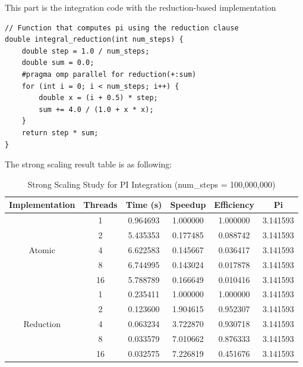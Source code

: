 \documentclass[11pt]{article}
\begin{document}
This part is the integration code with the reduction-based implementation
\begin{verbatim}
// Function that computes pi using the reduction clause
double integral_reduction(int num_steps) {
    double step = 1.0 / num_steps;
    double sum = 0.0;
    #pragma omp parallel for reduction(+:sum)
    for (int i = 0; i < num_steps; i++) {
        double x = (i + 0.5) * step;
        sum += 4.0 / (1.0 + x * x);
    }
    return step * sum;
}
\end{verbatim}

The strong scaling result table is as following:

\begin{table}[H]
\centering
\begin{tabular}{|c|c|c|c|c|c|}
\hline
\textbf{Implementation} & \textbf{Threads} & \textbf{Time (s)} & \textbf{Speedup} & \textbf{Efficiency} & \textbf{Pi} \\ \hline
\multirow{5}{*}{Atomic}
& 1 & 0.964693 & 1.000000 & 1.000000 & 3.141593 \\ \cline{2-6}
& 2 & 5.435353 & 0.177485 & 0.088742 & 3.141593 \\ \cline{2-6}
& 4 & 6.622583 & 0.145667 & 0.036417 & 3.141593 \\ \cline{2-6}
& 8 & 6.744995 & 0.143024 & 0.017878 & 3.141593 \\ \cline{2-6}
& 16 & 5.788789 & 0.166649 & 0.010416 & 3.141593 \\ \hline
\multirow{5}{*}{Reduction}
& 1 & 0.235411 & 1.000000 & 1.000000 & 3.141593 \\ \cline{2-6}
& 2 & 0.123600 & 1.904615 & 0.952307 & 3.141593 \\ \cline{2-6}
& 4 & 0.063234 & 3.722870 & 0.930718 & 3.141593 \\ \cline{2-6}
& 8 & 0.033579 & 7.010662 & 0.876333 & 3.141593 \\ \cline{2-6}
& 16 & 0.032575 & 7.226819 & 0.451676 & 3.141593 \\ \hline
\end{tabular}
\caption{Strong Scaling Study for PI Integration (num\_steps = 100,000,000)}
\label{tab:pi_scaling}
\end{table}
\end{document}
